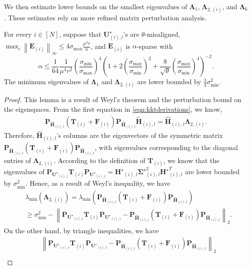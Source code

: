\documentclass[twoside,11pt]{article}
\newcommand{\norm}[1]{\left\lVert#1\right\rVert}
\newcommand{\matE}{\mathbf{E}}
\newcommand{\matF}{\mathbf{F}}
\newcommand{\hmatH}{{\hat{\mathbf{H}}}{}}
\newcommand{\matHst}{{\mathbf{H}^\star}}
\newcommand{\matP}{\mathbf{P}}
\newcommand{\matSigmast}{{\mathbf{\Sigma}^\star}}
\newcommand{\matT}{\mathbf{T}}
\newcommand{\matLambda}{\mathbf{\Lambda}}
\newcommand{\matU}{\mathbf{U}}
\newcommand{\matUst}{{\mathbf{U}^\star}}
\newcommand{\gop}{\sigma_{\max}}
\newcommand{\bn}{{\overline{n}}}
\newcommand{\sm}{\sigma_{\min}}
\newcommand{\sms}{\sigma_{\min}^2}
\begin{document}
We then estimate lower bounds on the smallest eigenvalues of $\matLambda_1$, $\matLambda_{2,(i)}$, and $\matLambda_6$. These estimates rely on more refined matrix perturbation analysis.

\begin{lemma}
\label{lm:eigenvaluelowerbound}
For every $i\in [N]$, suppose that $\matU^\star_{(i),l}$'s are $\theta$-misaligned, $\max_i\norm{\matE_{(i)}}_{\infty}\le 4\gop\frac{\mu^2 r}{\bn}$, and $\matE_{(i)}$ is $\alpha$-sparse with
$$
\alpha \le \frac{1}{64}\frac{1}{\mu^4r^2}\left(\frac{\sm}{\gop}\right)^4\left(1+2\left(\frac{\gop}{\sm}\right)^2+\frac{8}{\sqrt{\theta}}\left(\frac{\gop}{\sm}\right)^4\right)^{-2}.
$$
The minimum eigenvalues of $\matLambda_{1}$ and $\matLambda_{2,(i)}$ are lower bounded by $\frac{3}{4}\sms$. 
\end{lemma}
\begin{proof}
This lemma is a result of Weyl's theorem \citep{taoblog} and the perturbation bound on the eigenspaces. 
From the first equation in \eqref{eqn:kktderivations}, we know,
\begin{equation*}
\begin{aligned}
\matP_{\hmatH_{(i),l}}\left(\matT_{(i)}+\matF_{(i)}\right)\matP_{\hmatH_{(i),l}}\hmatH_{(i),l}=\hmatH_{(i),l}\bm{\Lambda}_{2,(i)}.
\end{aligned}   
\end{equation*}
Therefore, $\hmatH_{(i),l}$'s columns are the eigenvectors of the symmetric matrix $\matP_{\hmatH_{(i),l}}\left(\matT_{(i)}+\matF_{(i)}\right)\matP_{\hmatH_{(i),l}}$, with eigenvalues corresponding to the diagonal entries of $\bm{\Lambda}_{2,(i)}$. 
According to the definition of $\matT_{(i)}$, we know that the eigenvalues of $\matP_{\matUst_{(i),l}}\matT_{(i)}\matP_{\matUst_{(i),l}}=\matHst_{(i),l}\matSigmast_{(i),l}^2\matHst_{(i),l}^T$ are lower bounded by $\sms$. Hence, as a result of Weyl's inequality, we have
$$
\begin{aligned}
&\lambda_{\min}\left(\matLambda_{2,(i)}\right)=\lambda_{\min}\left(\matP_{\hmatH_{(i),l}}\left(\matT_{(i)}+\matF_{(i)}\right)\matP_{\hmatH_{(i),l}}\right)\\
&\ge \sms-\norm{\matP_{\matUst_{(i),l}}\matT_{(i)}\matP_{\matUst_{(i),l}}-\matP_{\hmatH_{(i),l}}\left(\matT_{(i)}+\matF_{(i)}\right)\matP_{\hmatH_{(i),l}}}_2 .
\end{aligned}
$$
On the other hand, by triangle inequalities, we have
\begin{align*}
&\norm{\matP_{\matUst_{(i),l}}\matT_{(i)}\matP_{\matUst_{(i),l}}-\matP_{\hmatH_{(i),l}}\left(\matT_{(i)}+\matF_{(i)}\right)\matP_{\hmatH_{(i),l}}}_2 \\

\end{align*}
\end{proof}
\end{document}
